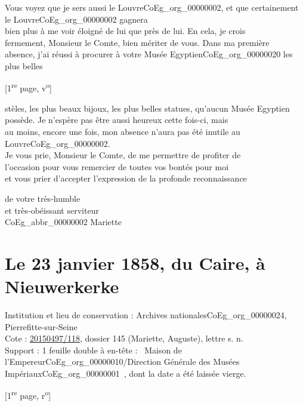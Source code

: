 \documentclass{book}
\begin{document}
Vous voyez que je sers aussi le Louvre\gls{CoEg_org_00000002}, et que certainement le Louvre\gls{CoEg_org_00000002} gagnera\\
bien plus à me voir éloigné de lui que près de lui. En cela, je crois\\
fermement, Monsieur le Comte, bien mériter de vous. Dans ma première\\
absence, j’ai réussi à procurer à votre Musée Egyptien\gls{CoEg_org_00000020} les plus belles
{\footnotesize \begin{center} {[1\textsuperscript{re} page, v\textsuperscript{o}]}\end{center}}
\noindent stèles, les plus beaux bijoux, les plus belles statues, qu’aucun Musée Egyptien\\
possède. Je n’espère pas être aussi heureux cette fois-ci, mais\\
au moins, encore une fois, mon absence n’aura pas été inutile au\\
Louvre\gls{CoEg_org_00000002}.\\
\indent Je vous prie, Monsieur le Comte, de me permettre de profiter de\\
l’occasion pour vous remercier de toutes vos bontés pour moi\\
et vous prier d’accepter l’expression de la profonde reconnaissance
\begin{center}\hspace{5cm}de votre très-humble\\
\hspace{5cm}et très-obéissant serviteur\\
\hspace{5cm} \gls{CoEg_abbr_00000002} Mariette\end{center}
\section*{Le 23 janvier 1858, du Caire, à Nieuwerkerke} \label{CoEg_Mariette_1858-01-23} 
{\footnotesize
\noindent Institution et lieu de conservation : Archives nationales\gls{CoEg_org_00000024}, Pierrefitte-sur-Seine\\
Cote : \hyperref[CoEg_Mariette_ms_001]{20150497/118}, dossier 145 (Mariette, Auguste), lettre s. n.\\
Support : 1 feuille double à en-tête : \og ~Maison de l'Empereur\gls{CoEg_org_00000010}/Direction Générale des Musées Impériaux\gls{CoEg_org_00000001}~\fg, dont la date a été laissée vierge.
\begin{center} {[1\textsuperscript{re} page, r\textsuperscript{o}]}\end{center}}
\end{document}
